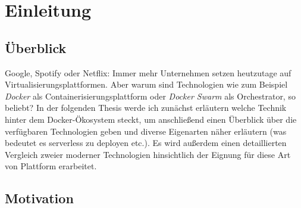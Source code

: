 \chapter{Einleitung \checkmark \checkmark}

\section{\"Uberblick \checkmark \checkmark}

Google, Spotify oder Netflix: Immer mehr Unternehmen setzen heutzutage auf Virtualisierungsplattformen. Aber warum sind Technologien wie zum Beispiel \emph{Docker} als Containerisierungsplattform oder \emph{Docker Swarm} als Orchestrator, so beliebt? In der folgenden Thesis werde ich zunächst erläutern welche Technik hinter dem Docker-Ökosystem steckt, um anschließend einen Überblick über die verfügbaren Technologien geben und diverse Eigenarten näher erläutern (was bedeutet es serverless zu deployen etc.). Es wird außerdem einen detaillierten Vergleich zweier moderner Technologien hinsichtlich der Eignung für diese Art von Plattform erarbeitet.


\section{Motivation \checkmark \checkmark}

